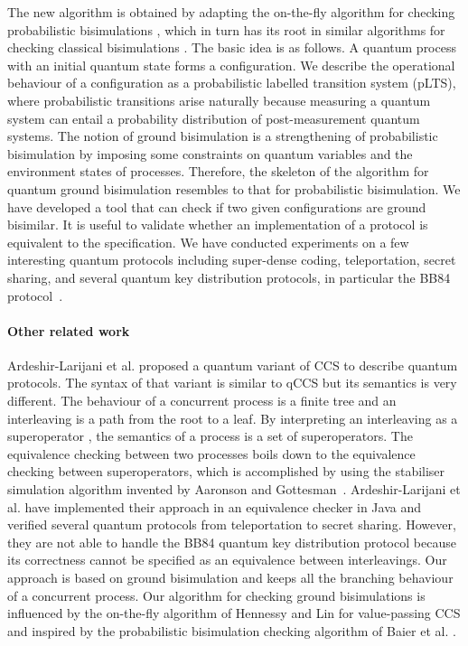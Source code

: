 \documentclass[a4paper,runningheads]{llncs}
\begin{document}
The new algorithm is obtained by adapting the on-the-fly algorithm for checking probabilistic bisimulations \cite{Deng15}, which in turn has its root in similar algorithms
for checking classical bisimulations \cite{FM90,HL95}. The basic idea is as follows. A quantum process with an initial quantum state forms a configuration. We describe the operational behaviour of a configuration as a probabilistic labelled transition system (pLTS), where probabilistic transitions arise naturally because measuring a quantum system can entail a probability distribution of post-measurement quantum systems. The notion of ground bisimulation is a strengthening of probabilistic bisimulation by imposing some constraints on quantum variables and the environment states of processes. Therefore, the skeleton of the algorithm for quantum ground bisimulation resembles to that for probabilistic bisimulation.
We have developed a tool that can check if two given configurations are ground bisimilar. It is useful to validate whether an implementation of a protocol is equivalent to the specification. We have conducted experiments on a few interesting quantum protocols including super-dense coding, teleportation, secret sharing, and several quantum key distribution protocols, in particular the BB84 protocol~\cite{BB84}.

\paragraph{Other related work} 
 Ardeshir-Larijani et al. \cite{AL18} proposed a quantum variant of CCS  to describe quantum protocols. The syntax of that variant is similar to qCCS but its semantics is very different. The behaviour of a concurrent process is a finite tree and an interleaving is a path from the root to a leaf. By interpreting an interleaving as a superoperator \cite{Sel04}, the semantics of a process is a set of superoperators. The equivalence checking between two processes boils down to the equivalence checking between superoperators, which is accomplished by using the stabiliser simulation algorithm  invented by Aaronson and Gottesman~\cite{AG04}. Ardeshir-Larijani et al. have implemented their approach in an equivalence checker in Java and verified several quantum protocols from teleportation to secret sharing. 
However, they are not able to handle the BB84 quantum key distribution protocol because its correctness cannot be specified as an equivalence between interleavings.
Our approach is based on ground bisimulation and keeps all the branching behaviour of a concurrent process. Our algorithm for checking ground bisimulations is influenced by the on-the-fly algorithm of Hennessy and Lin for value-passing CCS \cite{HL95} and inspired by the probabilistic bisimulation checking algorithm of Baier et al. \cite{BEM00}.
\end{document}
